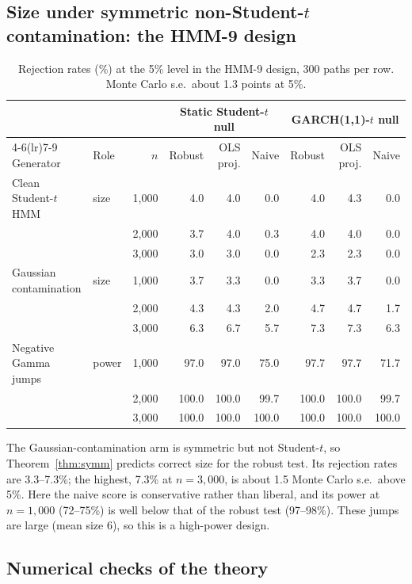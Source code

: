 \documentclass[11pt,a4paper]{article}
\theoremstyle{definition}
\theoremstyle{remark}
\begin{document}
\subsection{Size under symmetric non-Student-$t$ contamination: the HMM-9 design}\label{sec:hmm9size}
\begin{table}[ht]\centering\footnotesize\setlength{\tabcolsep}{4pt}\caption{Rejection rates (\%) at the 5\% level in the HMM-9 design, 300 paths per row. Monte Carlo s.e.\ about 1.3 points at 5\%.}\label{tab:hmm9}
\begin{tabular}{llr rrr rrr}
\toprule
 & & & \multicolumn{3}{c}{Static Student-$t$ null} & \multicolumn{3}{c}{GARCH(1,1)-$t$ null}\\
\cmidrule(lr){4-6}\cmidrule(lr){7-9}
Generator & Role & $n$ & Robust & OLS proj. & Naive & Robust & OLS proj. & Naive\\
\midrule
Clean Student-$t$ HMM & size & 1,000 & 4.0 & 4.0 & 0.0 & 4.0 & 4.3 & 0.0\\
 & & 2,000 & 3.7 & 4.0 & 0.3 & 4.0 & 4.0 & 0.0\\
 & & 3,000 & 3.0 & 3.0 & 0.0 & 2.3 & 2.3 & 0.0\\
\addlinespace
Gaussian contamination & size & 1,000 & 3.7 & 3.3 & 0.0 & 3.3 & 3.7 & 0.0\\
 & & 2,000 & 4.3 & 4.3 & 2.0 & 4.7 & 4.7 & 1.7\\
 & & 3,000 & 6.3 & 6.7 & 5.7 & 7.3 & 7.3 & 6.3\\
\addlinespace
Negative Gamma jumps & power & 1,000 & 97.0 & 97.0 & 75.0 & 97.7 & 97.7 & 71.7\\
 & & 2,000 & 100.0 & 100.0 & 99.7 & 100.0 & 100.0 & 99.7\\
 & & 3,000 & 100.0 & 100.0 & 100.0 & 100.0 & 100.0 & 100.0\\
\bottomrule
\end{tabular}
\end{table}
The Gaussian-contamination arm is symmetric but not Student-$t$, so Theorem~\ref{thm:symm} predicts correct size for the robust test. Its rejection rates are 3.3--7.3\%; the highest, 7.3\% at $n=3{,}000$, is about 1.5 Monte Carlo s.e.\ above 5\%. Here the naive score is conservative rather than liberal, and its power at $n=1{,}000$ (72--75\%) is well below that of the robust test (97--98\%). These jumps are large (mean size 6), so this is a high-power design.

\subsection{Numerical checks of the theory}
\end{document}
